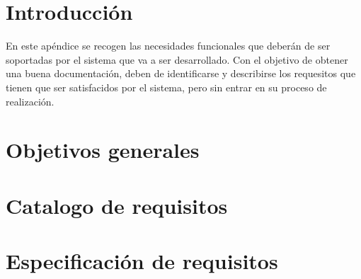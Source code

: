 
\section{Introducción}
En este apéndice se recogen las necesidades funcionales que deberán de ser soportadas por el sistema que va a ser desarrollado. Con el objetivo de obtener una buena documentación, deben de identificarse y describirse los requesitos que tienen que ser satisfacidos por el sistema, pero sin entrar en su proceso de realización.

\section{Objetivos generales}

\section{Catalogo de requisitos}

\section{Especificación de requisitos}


